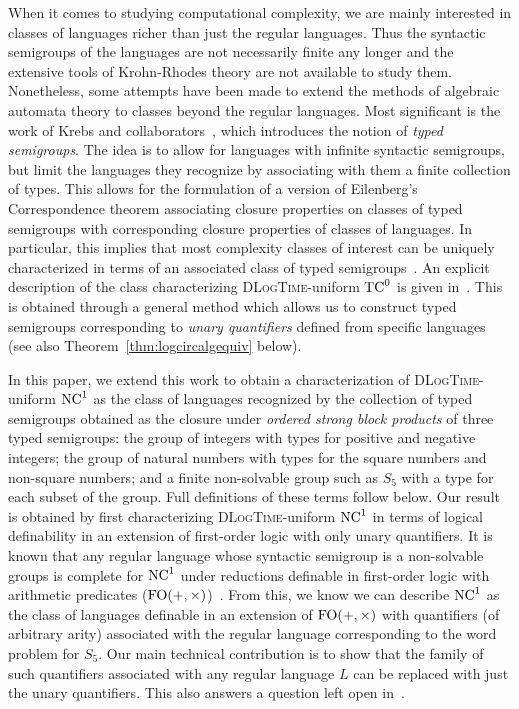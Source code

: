 \documentclass[a4paper,UKenglish,cleveref, autoref, thm-restate, anonymous]{lipics-v2021}
\begin{document}
When it comes to studying computational complexity, we are mainly interested in classes of languages richer than just the regular languages.  Thus the syntactic semigroups of the languages are not necessarily finite any longer and the extensive tools of Krohn-Rhodes theory are not available to study them.  Nonetheless, some attempts have been made to extend the methods of algebraic automata theory to classes beyond the regular languages.  Most significant is the work of Krebs and collaborators~\cite{behle2007linear,behle2011typed,krebs2007characterizing,krebs2008typed,cano2021positive}, which introduces the notion of \emph{typed semigroups}.  The idea is to allow for languages with infinite syntactic semigroups, but limit the languages they recognize by associating with them a finite collection of types.  This allows for the formulation of a version of Eilenberg's Correspondence theorem associating closure properties on classes of typed semigroups with corresponding closure properties of classes of languages.  In particular, this implies that most complexity classes of interest can be uniquely characterized in terms of an associated class of typed semigroups~\cite{behle2011typed}.  An explicit description of the class characterizing \textsc{DLogTime}-uniform $\mathrm{TC}^0$ is given in~\cite{krebs2007characterizing,krebs2008typed}.  This is obtained through a general method which allows us to construct typed semigroups corresponding to \emph{unary quantifiers} defined from specific languages~\cite{krebs2008typed} (see also Theorem~\ref{thm:logcircalgequiv} below).

In this paper, we extend this work to obtain a characterization of \textsc{DLogTime}-uniform $\mathrm{NC}^1$ as the class of languages recognized by the collection of typed semigroups obtained as the closure under \emph{ordered strong block products} of three typed semigroups: the group of integers with types for positive and negative integers; the group of natural numbers with types for the square numbers and non-square numbers; and a finite non-solvable group such as $S_5$ with a type for each subset of the group.  Full definitions of these terms follow below.  Our result is obtained by first characterizing \textsc{DLogTime}-uniform $\mathrm{NC}^1$ in terms of logical definability in an extension of first-order logic with only unary quantifiers.  It is known that any regular language whose syntactic semigroup is a non-solvable groups is complete for $\mathrm{NC}^1$ under reductions definable in first-order logic with arithmetic predicates ($\mathrm{FO}(+,\times)$)~\cite{barrington1990uniformity}.  From this, we know we can describe $\mathrm{NC}^1$ as the class of languages definable in an extension of $\mathrm{FO}(+,\times)$ with quantifiers (of arbitrary arity) associated with the regular language corresponding to the word problem for $S_5$.  Our main technical contribution is to show that the family of such quantifiers associated with any regular language $L$ can be replaced with just the unary quantifiers.  This also answers a question left open in~\cite{lautemann2001descriptive}.
\end{document}
